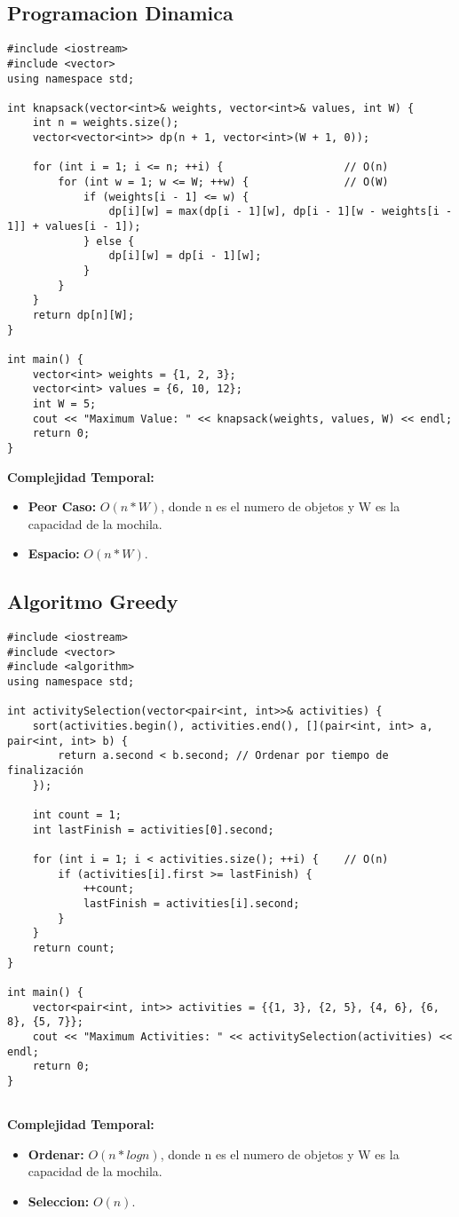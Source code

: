     \subsection{Programacion Dinamica}
    \begin{lstlisting}[style=cpp]
   #include <iostream>
#include <vector>
using namespace std;

int knapsack(vector<int>& weights, vector<int>& values, int W) {
    int n = weights.size();
    vector<vector<int>> dp(n + 1, vector<int>(W + 1, 0));

    for (int i = 1; i <= n; ++i) {                   // O(n)
        for (int w = 1; w <= W; ++w) {               // O(W)
            if (weights[i - 1] <= w) {
                dp[i][w] = max(dp[i - 1][w], dp[i - 1][w - weights[i - 1]] + values[i - 1]);
            } else {
                dp[i][w] = dp[i - 1][w];
            }
        }
    }
    return dp[n][W];
}

int main() {
    vector<int> weights = {1, 2, 3};
    vector<int> values = {6, 10, 12};
    int W = 5;
    cout << "Maximum Value: " << knapsack(weights, values, W) << endl;
    return 0;
}

    \end{lstlisting}
    \textbf{Complejidad Temporal: }
    \begin{itemize}
        \item \textbf{Peor Caso: }$O(n *W)$, donde n es el numero de objetos y W es la capacidad de la mochila.
        \item \textbf{Espacio: }$O(n*W).$
    \end{itemize}
\newpage
    \subsection{Algoritmo Greedy}
    \begin{lstlisting}[style=cpp]
#include <iostream>
#include <vector>
#include <algorithm>
using namespace std;

int activitySelection(vector<pair<int, int>>& activities) {
    sort(activities.begin(), activities.end(), [](pair<int, int> a, pair<int, int> b) {
        return a.second < b.second; // Ordenar por tiempo de finalización
    });

    int count = 1;
    int lastFinish = activities[0].second;

    for (int i = 1; i < activities.size(); ++i) {    // O(n)
        if (activities[i].first >= lastFinish) {
            ++count;
            lastFinish = activities[i].second;
        }
    }
    return count;
}

int main() {
    vector<pair<int, int>> activities = {{1, 3}, {2, 5}, {4, 6}, {6, 8}, {5, 7}};
    cout << "Maximum Activities: " << activitySelection(activities) << endl;
    return 0;
}


    \end{lstlisting}
    \textbf{Complejidad Temporal: }
    \begin{itemize}
        \item \textbf{Ordenar: }$O(n*logn)$, donde n es el numero de objetos y W es la capacidad de la mochila.
        \item \textbf{Seleccion: }$O(n).$
    \end{itemize}
\newpage
